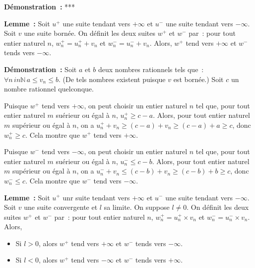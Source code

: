 \medskip

\noindent\textbf{Démonstration :} ***

\medskip

\noindent\textbf{Lemme :} Soit $u^+$ une suite tendant vers $+\infty$ et $u^-$ une suite tendant vers $-\infty$.
    Soit $v$ une suite bornée.
    On définit les deux suites $w^+$ et $w^-$ par : pour tout entier naturel $n$, $w^+_n = u^+_n + v_n$ et $w^-_n = u^ -_n + v_n$.
    Alors, $w^+$ tend vers $+\infty$ et $w^-$ tends vers $-\infty$.

\medskip

\noindent\textbf{Démonstration :} 
    Soit $a$ et $b$ deux nombres rationnels tels que : $\forall n \, in \mathbb{N} \, a \leq v_n \leq b$. 
    (De tels nombres existent puisque $v$ est bornée.)
    Soit $c$ un nombre rationnel quelconque.

    Puisque $w^+$ tend vers $+\infty$, on peut choisir un entier naturel $n$ tel que, pour tout entier naturel $m$ suérieur ou égal à $n$, $u^+_n \geq c - a$.
    Alors, pour tout entier naturel $m$ supérieur ou égal à $n$, on a $u^+_n + v_n \geq (c - a) + v_n \geq (c - a) + a \geq c$, donc $w^+_n \geq c$.
    Cela montre que $w^+$ tend vers $+\infty$.
    
    Puisque $w^-$ tend vers $-\infty$, on peut choisir un entier naturel $n$ tel que, pour tout entier naturel $m$ suérieur ou égal à $n$, $u^-_n \leq c - b$.
    Alors, pour tout entier naturel $m$ supérieur ou égal à $n$, on a $u^-_n + v_n \leq (c - b) + v_n \geq (c - b) + b \geq c$, donc $w^-_n \leq c$.
    Cela montre que $w^-$ tend vers $-\infty$.

    \done

\medskip

\noindent\textbf{Lemme :} Soit $u^+$ unr suite tendant vers $+\infty$ et $u^-$ une suite tendant vers $-\infty$.
    Soit $v$ une suite convergente et $l$ sa limite.
    On suppose $l \neq 0$.
    On définit les deux suites $w^+$ et $w^-$ par : pour tout entier naturel $n$, $w^+_n = u^+_n \times v_n$ et $w^-_n = u^ -_n \times v_n$.
    Alors, 
    \begin{itemize}[nosep]
        \item Si $l > 0$, alors $w^+$ tend vers $+\infty$ et $w^-$ tends vers $-\infty$.
        \item Si $l < 0$, alors $w^+$ tend vers $-\infty$ et $w^-$ tends vers $+\infty$.
    \end{itemize}

\medskip

